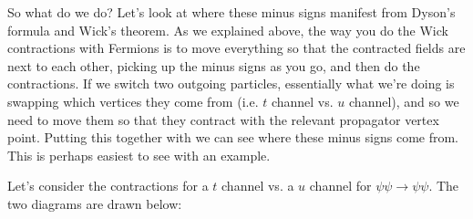 So what do we do? Let's look at where these minus signs manifest from Dyson's formula and Wick's theorem. As we explained above, the way you do the Wick contractions with Fermions is to move everything so that the contracted fields are next to each other, picking up the minus signs as you go, and then do the contractions. If we switch two outgoing particles, essentially what we're doing is swapping which vertices they come from (i.e. $t$ channel vs. $u$ channel), and so we need to move them so that they contract with the relevant propagator vertex point. Putting this together with  we can see where these minus signs come from. This is perhaps easiest to see with an example. 

\bex 
    Let's consider the contractions for a $t$ channel vs. a $u$ channel for $\psi\psi\to\psi\psi$. The two diagrams are drawn below:

